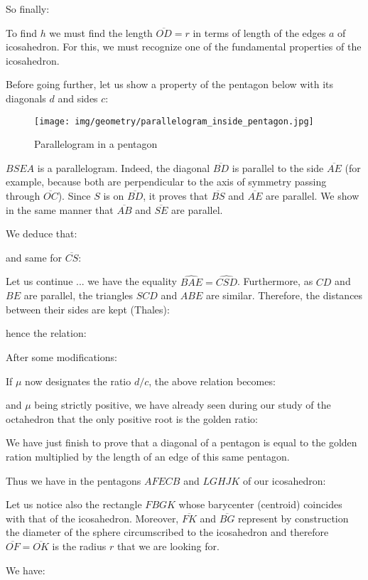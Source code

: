 {	So finally:
	
	To find $h$ we must find the length $\overline{OD}=r$ in terms of length of the edges $a$ of icosahedron. For this, we must recognize one of the fundamental properties of the icosahedron.

	Before going further, let us show a property of the pentagon below with its diagonals $d$ and sides $c$:
	\begin{figure}[H]
		\centering
		\texttt{[image: img/geometry/parallelogram\_inside\_pentagon.jpg]}
		\caption{Parallelogram in a pentagon}
	\end{figure}
	$BSEA$ is a parallelogram. Indeed, the diagonal $\overline{BD}$ is parallel to the side $\overline{AE}$ (for example, because both are perpendicular to the axis of symmetry passing through $\overline{OC}$). Since $S$ is on $\overline{BD}$, it proves that $\overline{BS}$ and $\overline{AE}$ are parallel. We show in the same manner that $\overline{AB}$ and $\overline{SE}$ are parallel.
	
	We deduce that:
	
	and same for $\overline{CS}$:
	
	Let us continue ... we have the equality $\widehat{BAE}=\widehat{CSD}$. Furthermore, as $CD$ and $BE$ are parallel, the triangles $SCD$ and $ABE$ are similar. Therefore, the distances between their sides are kept (Thales):
	
	hence the relation:
	
	After some modifications:
	
	If $\mu$ now designates the ratio $d/c$, the above relation becomes:
	
	and $\mu$ being strictly positive, we have already seen during our study of the octahedron that the only positive root is the golden ratio:
	
	We have just finish to prove that a diagonal of a pentagon is equal to the golden ration multiplied by the length of an edge of this same pentagon.
	
	Thus we have in the pentagons $AFECB$ and $LGHJK$ of our icosahedron:
	
	Let us notice also the rectangle $FBGK$ whose barycenter (centroid) coincides with that of the icosahedron. Moreover, $\overline{FK}$ and $\overline{BG}$ represent by construction the diameter of the sphere circumscribed to the icosahedron and therefore $\overline{OF}=\overline{OK}$ is the radius $r$ that we are looking for.

	We have:
	
}
